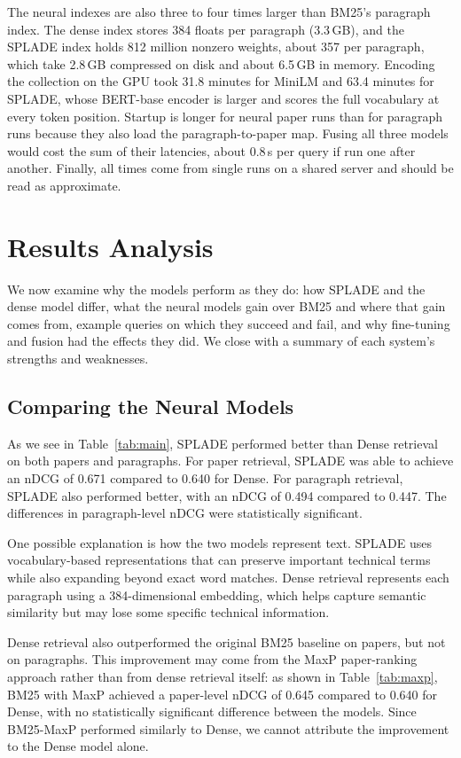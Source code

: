 \documentclass[sigconf,nonacm]{acmart}
\begin{document}
The neural indexes are also three to four times larger than BM25's paragraph index. 
The dense index stores 384 floats per paragraph (3.3\,GB), and the SPLADE index holds 
812 million nonzero weights, about 357 per paragraph, which take 2.8\,GB compressed 
on disk and about 6.5\,GB in memory. Encoding the collection on the GPU took 31.8 
minutes for MiniLM and 63.4 minutes for SPLADE, whose BERT-base encoder is larger 
and scores the full vocabulary at every token position. Startup is longer for neural 
paper runs than for paragraph runs because they also load the paragraph-to-paper map. 
Fusing all three models would cost the sum of their latencies, about 0.8\,s per query 
if run one after another. Finally, all times come from single runs on a shared server 
and should be read as approximate.

\section{Results Analysis}
\label{sec:analysis}
We now examine why the models perform as they do: how SPLADE and the dense model 
differ, what the neural models gain over BM25 and where that gain comes from, 
example queries on which they succeed and fail, and why fine-tuning and fusion had 
the effects they did. We close with a summary of each system's strengths and 
weaknesses.

\subsection{Comparing the Neural Models}
\label{sec:neural-compare}
As we see in Table~\ref{tab:main}, SPLADE performed better
than Dense retrieval on both papers and paragraphs. For paper
retrieval, SPLADE was able to achieve an nDCG of 0.671 compared
to 0.640 for Dense. For paragraph retrieval, SPLADE also 
performed better, with an nDCG of 0.494 compared to 0.447. The
differences in paragraph-level nDCG were statistically significant.

One possible explanation is how the two models represent text. SPLADE
uses vocabulary-based representations that can preserve important 
technical terms while also expanding beyond exact word matches. Dense
retrieval represents each paragraph using a 384-dimensional embedding, 
which helps capture semantic similarity but may lose some specific
technical information. 

Dense retrieval also outperformed the original BM25 baseline on papers,
but not on paragraphs. This improvement may come from the MaxP
paper-ranking approach rather than from dense retrieval itself: as shown
in Table~\ref{tab:maxp}, BM25 with MaxP achieved a paper-level nDCG of
0.645 compared to 0.640 for Dense, with no statistically significant
difference between the models. Since BM25-MaxP performed similarly to
Dense, we cannot attribute the improvement to the Dense model alone.
\end{document}
